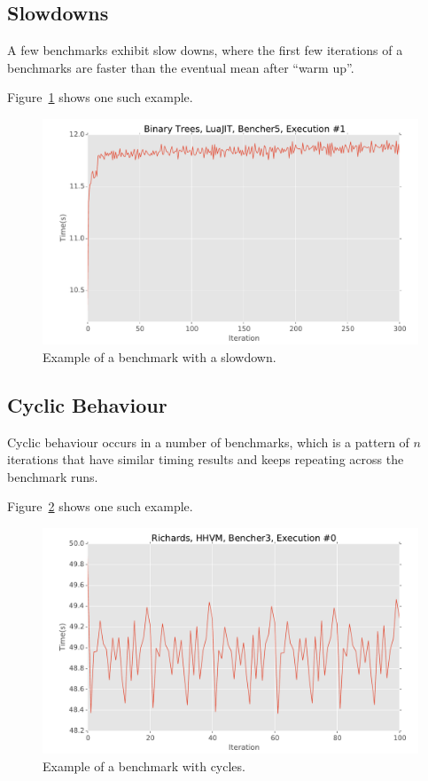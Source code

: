 \documentclass[10pt,preprint]{sigplanconf}
\begin{document}
\subsection{Slowdowns}
\label{sub:slowdowns}


A few benchmarks exhibit slow downs, where the first few iterations of a
benchmarks are faster than the eventual mean after ``warm up''.

Figure~\ref{fig:examples:slowdown1} shows one such example.

\begin{figure}[h!]
\centering
\includegraphics[width=.46\textwidth]{examples/slowdown1}
\caption{Example of a benchmark with a slowdown.}
\label{fig:examples:slowdown1}
\end{figure}



\subsection{Cyclic Behaviour}
\label{sub:cyclic}

Cyclic behaviour occurs in a number of benchmarks, which is a pattern of $n$
iterations that have similar timing results and keeps repeating across the
benchmark runs.

Figure~\ref{fig:examples:cycles1} shows one such example.

\begin{figure}[h!]
\centering
\includegraphics[width=.46\textwidth]{examples/cycles1}
\caption{Example of a benchmark with cycles.}
\label{fig:examples:cycles1}
\end{figure}
\end{document}
